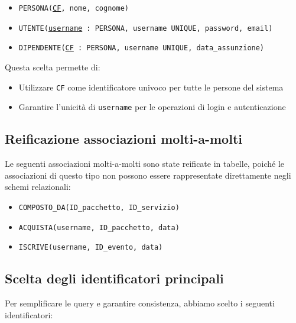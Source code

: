 \documentclass[a4paper,12pt]{report}
\begin{document}
\begin{itemize}
	\item \texttt{PERSONA(\underline{CF}, nome, cognome)}
	\item \texttt{UTENTE(\underline{username} : PERSONA, username~UNIQUE, password, email)}
	\item \texttt{DIPENDENTE(\underline{CF} : PERSONA, username~UNIQUE, data\_assunzione)}
\end{itemize}

\vspace{\baselineskip}
\noindent Questa scelta permette di:
\begin{itemize}
	\item Utilizzare \texttt{CF} come identificatore univoco per tutte le persone del sistema
	\item Garantire l'unicità di \texttt{username} per le operazioni di login e autenticazione
\end{itemize}

\subsection{Reificazione associazioni molti-a-molti}

Le seguenti associazioni molti-a-molti sono state reificate in tabelle, poiché le associazioni di
questo tipo non possono essere rappresentate direttamente negli schemi relazionali:

\begin{itemize}
	\item \texttt{COMPOSTO\_DA(ID\_pacchetto, ID\_servizio)}
	\item \texttt{ACQUISTA(username, ID\_pacchetto, data)}
	\item \texttt{ISCRIVE(username, ID\_evento, data)}
\end{itemize}

\subsection{Scelta degli identificatori principali}
Per semplificare le query e garantire consistenza, abbiamo scelto i seguenti identificatori:
\end{document}

